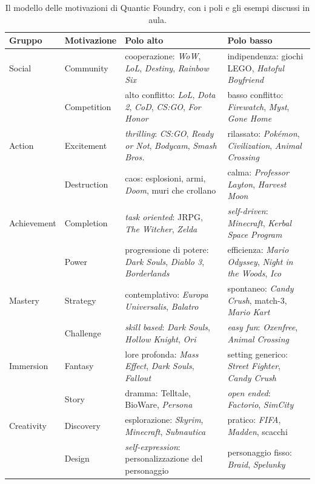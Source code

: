 \begin{table}[htbp]
  \centering
  \caption{Il modello delle motivazioni di Quantic Foundry, con i poli e gli
  esempi discussi in aula.}
  \label{tab:quantic}
  \small
  \begin{tabular}{@{}p{}p{}p{}p{}@{}}
    \toprule
    \textbf{Gruppo} & \textbf{Motivazione} & \textbf{Polo alto} & \textbf{Polo basso} \\
    \midrule
    Social & Community & cooperazione: \emph{WoW}, \emph{LoL}, \emph{Destiny}, \emph{Rainbow Six} & indipendenza: giochi LEGO, \emph{Hatoful Boyfriend} \\
    & Competition & alto conflitto: \emph{LoL}, \emph{Dota 2}, \emph{CoD}, \emph{CS:GO}, \emph{For Honor} & basso conflitto: \emph{Firewatch}, \emph{Myst}, \emph{Gone Home} \\
    Action & Excitement & \emph{thrilling}: \emph{CS:GO}, \emph{Ready or Not}, \emph{Bodycam}, \emph{Smash Bros.} & rilassato: \emph{Pokémon}, \emph{Civilization}, \emph{Animal Crossing} \\
    & Destruction & caos: esplosioni, armi, \emph{Doom}, muri che crollano & calma: \emph{Professor Layton}, \emph{Harvest Moon} \\
    Achievement & Completion & \emph{task oriented}: JRPG, \emph{The Witcher}, \emph{Zelda} & \emph{self-driven}: \emph{Minecraft}, \emph{Kerbal Space Program} \\
    & Power & progressione di potere: \emph{Dark Souls}, \emph{Diablo 3}, \emph{Borderlands} & efficienza: \emph{Mario Odyssey}, \emph{Night in the Woods}, \emph{Ico} \\
    Mastery & Strategy & contemplativo: \emph{Europa Universalis}, \emph{Balatro} & spontaneo: \emph{Candy Crush}, match-3, \emph{Mario Kart} \\
    & Challenge & \emph{skill based}: \emph{Dark Souls}, \emph{Hollow Knight}, \emph{Ori} & \emph{easy fun}: \emph{Oxenfree}, \emph{Animal Crossing} \\
    Immersion & Fantasy & lore profonda: \emph{Mass Effect}, \emph{Dark Souls}, \emph{Fallout} & setting generico: \emph{Street Fighter}, \emph{Candy Crush} \\
    & Story & dramma: Telltale, BioWare, \emph{Persona} & \emph{open ended}: \emph{Factorio}, \emph{SimCity} \\
    Creativity & Discovery & esplorazione: \emph{Skyrim}, \emph{Minecraft}, \emph{Subnautica} & pratico: \emph{FIFA}, \emph{Madden}, scacchi \\
    & Design & \emph{self-expression}: personalizzazione del personaggio & personaggio fisso: \emph{Braid}, \emph{Spelunky} \\
    \bottomrule
  \end{tabular}
\end{table}

